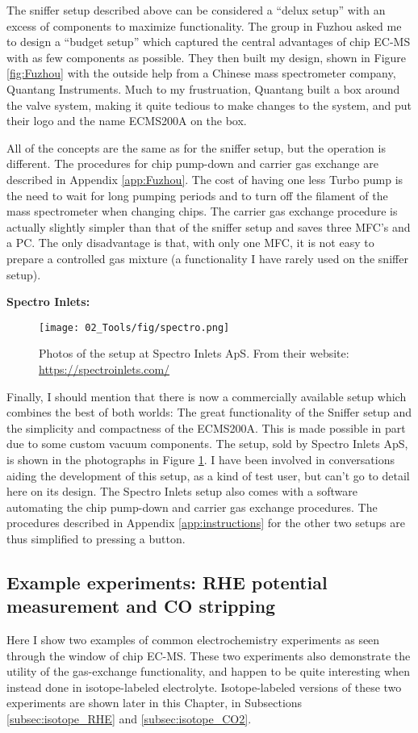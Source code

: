 The sniffer setup described above can be considered a ``delux setup'' with an excess of components to maximize functionality. The group in Fuzhou asked me to design a ``budget setup'' which captured the central advantages of chip EC-MS with as few components as possible. They then built my design, shown in Figure \ref{fig:Fuzhou} with the outside help from a Chinese mass spectrometer company, Quantang Instruments. Much to my frustruation, Quantang built a box around the valve system, making it quite tedious to make changes to the system, and put their logo and the name ECMS200A on the box.

All of the concepts are the same as for the sniffer setup, but the operation is different. The procedures for chip pump-down and carrier gas exchange are described in Appendix \ref{app:Fuzhou}. The cost of having one less Turbo pump is the need to wait for long pumping periods and to turn off the filament of the mass spectrometer when changing chips. The carrier gas exchange procedure is actually slightly simpler than that of the sniffer setup and saves three MFC's and a PC. The only disadvantage is that, with only one MFC, it is not easy to prepare a controlled gas mixture (a functionality I have rarely used on the sniffer setup).

\vspace{1cm}
\textbf{\large Spectro Inlets:}

\begin{figure}[h!]
	\centering
	\texttt{[image: 02\_Tools/fig/spectro.png]}
	\caption{Photos of the setup at Spectro Inlets ApS. From their website: \url{https://spectroinlets.com/}}
	\label{fig:spectro}
\end{figure}
Finally, I should mention that there is now a commercially available setup which combines the best of both worlds: The great functionality of the Sniffer setup and the simplicity and compactness of the ECMS200A. This is made possible in part due to some custom vacuum components. The setup, sold by Spectro Inlets ApS, is shown in the photographs in Figure \ref{fig:spectro}. I have been involved in conversations aiding the development of this setup, as a kind of test user, but can't go to detail here on its design. The Spectro Inlets setup also comes with a software automating the chip pump-down and carrier gas exchange procedures. The procedures described in Appendix \ref{app:instructions} for the other two setups are thus simplified to pressing a button.


\subsection{Example experiments: RHE potential measurement and CO stripping}\label{subsec:examples}
Here I show two examples of common electrochemistry experiments as seen through the window of chip EC-MS. These two experiments also demonstrate the utility of the gas-exchange functionality, and happen to be quite interesting when instead done in isotope-labeled electrolyte. Isotope-labeled versions of these two experiments are shown later in this Chapter, in Subsections \ref{subsec:isotope_RHE} and \ref{subsec:isotope_CO2}.

